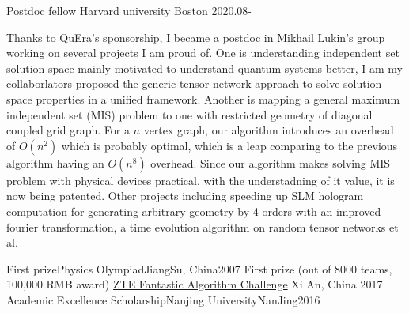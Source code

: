 \documentclass[11pt, a4paper]{awesome-cv}
\begin{document}
\begin{cventries}
  \cventry
    {Postdoc fellow}
    {Harvard university}
    {Boston}
    {2020.08-}  %
    {\begin{cvitems}Thanks to QuEra's sponsorship, I became a postdoc in Mikhail Lukin's group working on several projects I am proud of.
    One is understanding independent set solution space mainly motivated to understand quantum systems better, I am my collaborlators proposed the generic tensor network approach to solve solution space properties in a unified framework.
        Another is mapping a general maximum independent set (MIS) problem to one with restricted geometry of diagonal coupled grid graph.
    For a $n$ vertex graph, our algorithm introduces an overhead of $O(n^2)$ which is probably optimal, which is a leap comparing to the previous algorithm having an $O(n^8)$ overhead. Since our algorithm makes solving MIS problem with physical devices practical, with the understadning of it value, it is now being patented.
    Other projects including speeding up SLM hologram computation for generating arbitrary geometry by 4 orders with an improved fourier transformation, a time evolution algorithm on random tensor networks et al.
    \end{cvitems}}
\end{cventries}
%
\begin{cvhonors}
    \cvhonor
    {First prize}{Physics Olympiad}{JiangSu, China}{2007}
    \cvhonor
    {First prize (out of 8000 teams, 100,000 RMB award)} %
    {\href{http://www.iqiyi.com/w\_19rto3v4h1.html}{ZTE Fantastic Algorithm Challenge}} %
    {Xi An, China} %
    {2017} %
    \cvhonor
    {Academic Excellence Scholarship}{Nanjing University}{NanJing}{2016}
\end{cvhonors}
\end{document}
